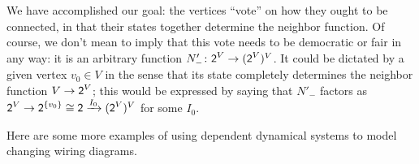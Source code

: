 \documentclass[Book-Poly]{subfiles}
\begin{document}
\begin{example}
We have accomplished our goal: the vertices ``vote'' on how they ought to be connected, in that their states together determine the neighbor function.
Of course, we don't mean to imply that this vote needs to be democratic or fair in any way: it is an arbitrary function $N'_-\colon \textsf{2}^V\to(\textsf{2}^V)^V$.
It could be dictated by a given vertex $v_0\in V$ in the sense that its state completely determines the neighbor function $V\to\textsf{2}^V$; this would be expressed by saying that $N'_-$ factors as $\textsf{2}^V\to\textsf{2}^{\{v_0\}}\cong\textsf{2}\xrightarrow{I_0}(\textsf{2}^V)^V$ for some $I_0$.
\end{example}


Here are some more examples of using dependent dynamical systems to model changing wiring diagrams.
\end{document}
